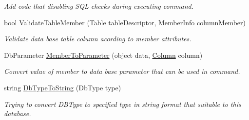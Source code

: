 \begin{DoxyCompactItemize}
\begin{DoxyCompactList}\small\item\em Add code that disabling S\+QL checks during executing command. \end{DoxyCompactList}\item 
bool \mbox{\hyperlink{class_uniform_data_operator_1_1_sql_1_1_my_sql_1_1_my_sql_data_operator_a233ab791c68b93aded97bfd9986767e8}{Validate\+Table\+Member}} (\mbox{\hyperlink{class_uniform_data_operator_1_1_sql_1_1_attributes_1_1_table}{Table}} table\+Descriptor, Member\+Info column\+Member)
\begin{DoxyCompactList}\small\item\em Validate data base table column acording to member attributes. \end{DoxyCompactList}\item 
Db\+Parameter \mbox{\hyperlink{class_uniform_data_operator_1_1_sql_1_1_my_sql_1_1_my_sql_data_operator_a7d10fc1dfc16ece78ad066f596523782}{Member\+To\+Parameter}} (object data, \mbox{\hyperlink{class_uniform_data_operator_1_1_sql_1_1_attributes_1_1_column}{Column}} column)
\begin{DoxyCompactList}\small\item\em Convert value of member to data base parameter that can be used in command. \end{DoxyCompactList}\item 
string \mbox{\hyperlink{class_uniform_data_operator_1_1_sql_1_1_my_sql_1_1_my_sql_data_operator_a7b854ebbcdf31c67716d8c365c321a31}{Db\+Type\+To\+String}} (Db\+Type type)
\begin{DoxyCompactList}\small\item\em Trying to convert D\+B\+Type to specified type in string format that suitable to this database. \end{DoxyCompactList}\end{DoxyCompactItemize}
